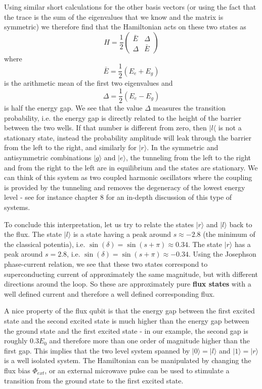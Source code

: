 \documentclass[a4paper, draft]{article}
\theoremstyle{own}
\theoremstyle{remark}
\begin{document}
Using similar short calculations for the other basis vectors (or using the fact that the trace is the sum of the eigenvalues that we know and the matrix is symmetric) we therefore find that the Hamiltonian acts on these two states as
$$
H = \frac{1}{2} 
\begin{pmatrix}
\bar{E} & \Delta \\
\Delta & \bar{E}
\end{pmatrix} 
$$
where
$$
\bar{E} = \frac{1}{2} (E_e + E_g) 
$$
is the arithmetic mean of the first two eigenvalues and 
$$
\Delta = \frac{1}{2} (E_e - E_g)
$$
is half the energy gap. We see that the value $\Delta$ measures the transition probability, i.e. the energy gap is directly related to the height of the barrier between the two wells. If that number is different from zero, then $|l \langle$ is not a stationary state, instead the probability amplitude will leak through the barrier from the left to the right, and similarly for $|r \rangle$. In the symmetric and antisymmetric combinations $|g \rangle$ and $|e \rangle$, the tunneling from the left to the right and from the right to the left are in equilibrium and the states are stationary. We can think of this system as two coupled harmonic oscillators where the coupling is provided by the tunneling and removes the degeneracy of the lowest energy level - see for instance \cite{FeynmanIII} chapter 8 for an in-depth discussion of this type of systems. 

To conclude this interpretation, let us try to relate the states $|r \rangle$ and $|l \rangle$ back to the flux. The state $|l \rangle$ is a state having a peak around $s \approx -2.8$ (the minimum of the classical potentia), i.e. $\sin(\delta) = \sin(s + \pi) \approx 0.34$. The state $|r \rangle$ has a peak around $s = 2.8$, i.e. 
$\sin(\delta) =  \sin(s + \pi) \approx -0.34$. Using the Josephson phase-current relation, we see that these two states correspond to superconducting current of approximately the same magnitude, but with different directions around the loop. So these are approximately pure {\bf flux states} with a well defined current and therefore a well defined corresponding flux. 

A nice property of the flux qubit is that the energy gap between the first excited state and the second excited state is much higher than the energy gap between the ground state and the first excited state - in our example, the second gap is roughly $0.3 E_0$ and therefore more than one order of magnitude higher than the first gap. This implies that the two level system spanned by $|0 \rangle = |l \rangle$ and $|1 \rangle = |r \rangle$ is a well isolated system. The Hamiltonian can be manipulated by changing the flux bias $\Phi_{ext}$, or an external microwave pulse can be used to stimulate a transition from the ground state to the first excited state. 
\end{document}
